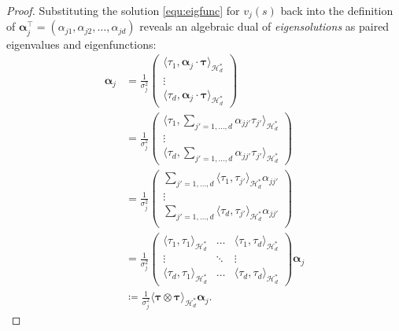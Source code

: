 \documentclass[pdflatex,iicol]{sn-jnl}%
\theoremstyle{thmstyleone}%
\theoremstyle{thmstyletwo}%
\theoremstyle{thmstylethree}%
\begin{document}
\begin{proof}
    Substituting the solution \eqref{equ:eigfunc} for $v_j(s)$ back into the definition of $\boldsymbol{\alpha}^{\top}_j = (\alpha_{j1},\alpha_{j2},\dots,\alpha_{jd})$ reveals an algebraic dual of \emph{eigensolutions} as paired eigenvalues and eigenfunctions:
    \begin{align} \label{eq:the_Panda}
        \boldsymbol{\alpha}_j &= \frac{1}{\sigma_j^2}\left(\begin{matrix}
            \langle \tau_1,\boldsymbol{\alpha}_j \cdot \boldsymbol{\tau}\rangle_{\mathcal{H}^*_d}\\
            \vdots \\
            \langle \tau_d,\boldsymbol{\alpha}_j \cdot \boldsymbol{\tau}\rangle_{\mathcal{H}^*_d}
        \end{matrix}\right)\\
        &= \frac{1}{\sigma_j^2}\left(\begin{matrix}
            \langle \tau_1,\sum_{j'=1,\dots,d}\alpha_{jj'}\tau_{j'}\rangle_{\mathcal{H}^*_d}\\
            \vdots\\ \nonumber
            \langle \tau_d,\sum_{j'=1,\dots,d}\alpha_{jj'}\tau_{j'}\rangle_{\mathcal{H}^*_d}
            \end{matrix}\right)\\ \nonumber
        &= \frac{1}{\sigma_j^2}\left(\begin{matrix}
           \sum_{j'=1,\dots,d}\langle \tau_1,\tau_{j'}\rangle_{\mathcal{H}^*_d}\alpha_{jj'} \\
           \vdots\\
           \sum_{j'=1,\dots,d}\langle \tau_d,\tau_{j'}\rangle_{\mathcal{H}^*_d}\alpha_{jj'}\\
            \end{matrix}\right)\\ \nonumber
        &= \frac{1}{\sigma_j^2}\left(\begin{matrix}
            \langle \tau_1,\tau_1\rangle_{\mathcal{H}^*_d} & \dots & \langle \tau_1,\tau_d\rangle_{\mathcal{H}^*_d}\\
            \vdots & \ddots & \vdots \\
            \langle \tau_d,\tau_1\rangle_{\mathcal{H}^*_d} & \dots &\langle \tau_d,\tau_d\rangle_{\mathcal{H}^*_d}
        \end{matrix}\right)\boldsymbol{\alpha}_j\\ \nonumber
        &\coloneqq \frac{1}{\sigma_j^2}\langle \boldsymbol{\tau} \otimes \boldsymbol{\tau}\rangle_{\mathcal{H}^*_d}\boldsymbol{\alpha}_j. \nonumber

\end{align}
\end{proof}
\end{document}
